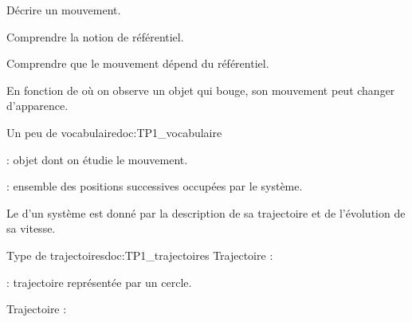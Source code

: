 \teteSndMouv

\pasCorrection{\nomPrenomClasse}




\begin{objectifs}
  \item Décrire un mouvement.
  \item Comprendre la notion de référentiel.
  \item Comprendre que le mouvement dépend du référentiel.
\end{objectifs}

\begin{contexte}
  En fonction de où on observe un objet qui bouge, son mouvement peut changer d'apparence.

\end{contexte}



\vspace*{6pt}
\begin{doc}{Un peu de vocabulaire}{doc:TP1_vocabulaire}
  \begin{importants}
     : objet dont on étudie le mouvement.
  \end{importants}
  
  \begin{importants}
     : ensemble des positions successives occupées par le système.
  \end{importants}
  
  Le  d'un système est donné par la description de sa trajectoire et de l'évolution de sa vitesse.
\end{doc} 


\begin{doc}{Type de trajectoires}{doc:TP1_trajectoires}
  Trajectoire  : 
  
   : trajectoire représentée par un cercle.
  
  Trajectoire  : 
\end{doc}


